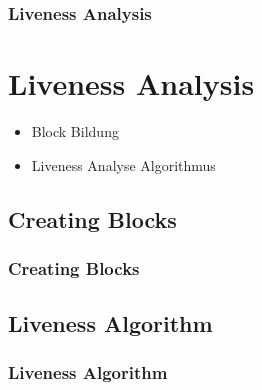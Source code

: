 \begin{frame}
    \frametitle{Liveness Analysis}
    \section*{Liveness Analysis}
    \begin{itemize}
        \item Block Bildung
        \item Liveness Analyse Algorithmus
    \end{itemize}
\end{frame}

\begin{frame}
    \section*{Creating Blocks}
    \frametitle{Creating Blocks}
\end{frame}

\begin{frame}
    \section*{Liveness Algorithm}
    \frametitle{Liveness Algorithm}
\end{frame}
